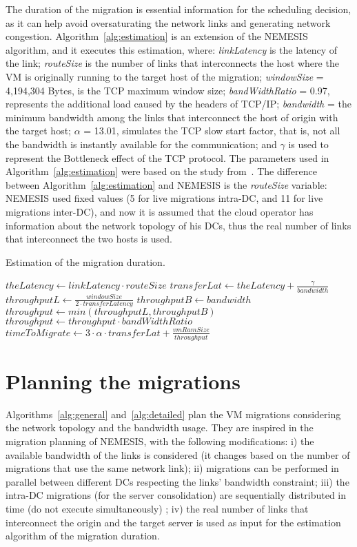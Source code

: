 The duration of the migration is essential information for the scheduling decision, as it can help avoid oversaturating the network links and generating network congestion. Algorithm~\ref{alg:estimation} is an extension of the NEMESIS algorithm, and it executes this estimation, where: \textit{linkLatency} is the latency of the link; \textit{routeSize} is the number of links that interconnects the host where the VM is originally running to the target host of the migration; \mbox{\textit{windowSize}} = 4,194,304 Bytes, is the TCP maximum window size; \textit{bandWidthRatio} = 0.97, represents the additional load caused by the headers of TCP/IP; \textit{bandwidth} = the minimum bandwidth among the links that interconnect the host of origin with the target host; $\alpha$ = 13.01, simulates the TCP slow start factor, that is, not all the bandwidth is instantly available for the communication; and $\gamma$ is used to represent the Bottleneck effect of the TCP protocol. The parameters used in Algorithm~\ref{alg:estimation} were based on the study from~\citet{velho2013simgridparameters}. The difference between Algorithm~\ref{alg:estimation}  and NEMESIS is the \textit{routeSize} variable: NEMESIS used fixed values (5 for live migrations intra-DC, and 11 for live migrations inter-DC), and now it is assumed that the cloud operator has information about the network topology of his DCs, thus the real number of links that interconnect the two hosts is used.

\begin{algorithm}
\begin{algorithmic}
\caption{Estimation of the migration duration.}\label{alg:estimation}
\State $theLatency \gets linkLatency \cdot routeSize$
\State $transferLat \gets theLatency + \frac{\gamma}{bandwidth}$
\State $throughputL \gets \frac{windowSize}{2 \cdot transferLatency}$
\State $throughputB \gets bandwidth$
\State $throughput \gets min(throughputL, throughputB)$
\State $throughput \gets throughput 
\cdot bandWidthRatio$
\State $timeToMigrate \gets  3 \cdot \alpha \cdot transferLat + \frac{vmRamSize}{throughput}$ 
\end{algorithmic}
\end{algorithm}

\section{Planning the migrations}
\label{sec:modeling_smargreens}

Algorithms~\ref{alg:general} and~\ref{alg:detailed} plan the VM migrations considering the network topology and the bandwidth usage. They are inspired in the migration planning of NEMESIS, with the following modifications: i) the available bandwidth of the links is considered (it changes based on the number of migrations that use the same network link); ii) migrations can be performed in parallel between different DCs respecting the links' bandwidth constraint; iii) the intra-DC migrations (for the server consolidation) are sequentially distributed in time (do not execute simultaneously) ; iv) the real number of links that interconnect the origin and the target server is used as input for the estimation algorithm of the migration duration.

